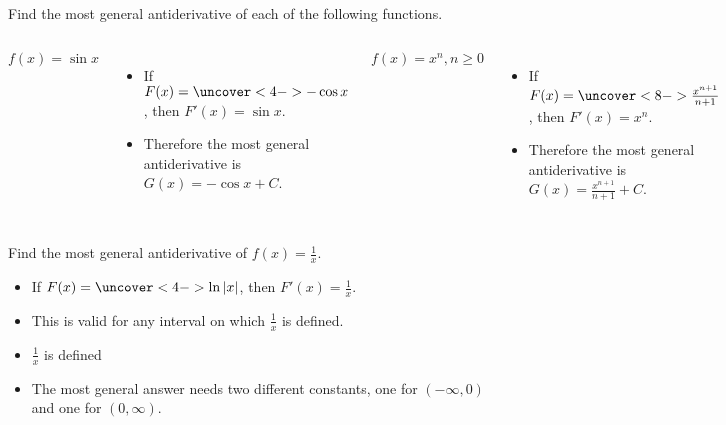 \begin{frame}
\begin{example}
Find the most general antiderivative of each of the following functions.
\begin{columns}[c]
\[
f(x) = \sin x%
\]
\begin{itemize}
\item<2->  If \alert<handout:0| 3-4>{$F(x) = \uncover<4->{-\cos x}$}, then $F'(x) = \sin x$.
\item<5->  Therefore the most general antiderivative is $G(x) = -\cos x + C$.
\end{itemize}
\[
f(x) = x^n, n\geq 0%
\]
\begin{itemize}
\item<6->  If \alert<handout:0| 7-8>{$F(x) = \uncover<8->{\frac{x^{n+1}}{n+1}}$}, then $F'(x) = x^n$.
\item<9->  Therefore the most general antiderivative is $G(x) = \frac{x^{n+1}}{n+1} + C$.
\end{itemize}
\end{columns}
\end{example}
\end{frame}


\begin{frame}
\begin{example}
Find the most general antiderivative of $\displaystyle f(x) = \frac{1}{x}$.%
\begin{itemize}
\item<2-> If \alert<handout:0| 3-4>{$F(x) = \uncover<4->{\ln |x|}$}, then $\displaystyle F'(x) = \frac{1}{x}$.
\item<5->  This is valid for any interval on which $\displaystyle \frac{1}{x}$ is defined.
\item<6-| alert@6-7>  $\displaystyle \frac{1}{x}$ is defined 
\item<8->  The most general answer needs two different constants, one for $(-\infty , 0)$ and one for $(0, \infty )$.
\end{itemize}
%
\end{example}
\end{frame}
